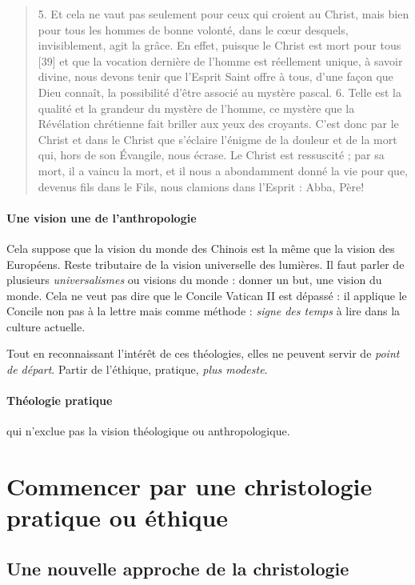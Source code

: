 \begin{quote}
5. Et cela ne vaut pas seulement pour ceux qui croient au Christ, mais bien pour tous les hommes de bonne volonté, dans le cœur desquels, invisiblement, agit la grâce. En effet, puisque le Christ est mort pour tous [39] et que la vocation dernière de l’homme est réellement unique, à savoir divine, nous devons tenir que l’Esprit Saint offre à tous, d’une façon que Dieu connaît, la possibilité d’être associé au mystère pascal.
6. Telle est la qualité et la grandeur du mystère de l’homme, ce mystère que la Révélation chrétienne fait briller aux yeux des croyants. C’est donc par le Christ et dans le Christ que s’éclaire l’énigme de la douleur et de la mort qui, hors de son Évangile, nous écrase. Le Christ est ressuscité ; par sa mort, il a vaincu la mort, et il nous a abondamment donné la vie pour que, devenus fils dans le Fils, nous clamions dans l’Esprit : Abba, Père!
\end{quote}

\paragraph{Une vision une de l'anthropologie} Cela suppose que la vision du monde des Chinois est la même que la vision des Européens. Reste tributaire de la vision universelle des lumières. Il faut parler de plusieurs \textit{universalismes} ou visions du monde : donner un but, une vision du monde. Cela ne veut pas dire que le Concile Vatican II est dépassé : il applique le Concile non pas à la lettre mais comme méthode : \textit{signe des temps } à lire dans la culture actuelle.

Tout en reconnaissant l'intérêt de ces théologies, elles ne peuvent servir de \textit{point de départ}. Partir de l'éthique, pratique, \textit{plus modeste}.

\paragraph{Théologie pratique} qui n'exclue pas la vision théologique ou anthropologique. 


\section{Commencer par une christologie pratique ou éthique}

\subsection{Une nouvelle approche de la christologie}

